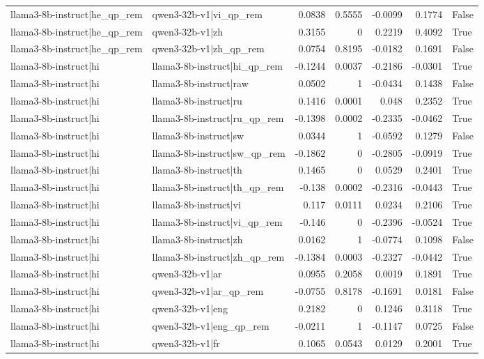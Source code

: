 \begin{table}
\begin{tabular}{l l r r r r l}
llama3-8b-instruct|he_qp_rem & qwen3-32b-v1|vi_qp_rem & 0.0838 & 0.5555 & -0.0099 & 0.1774 & False \\
llama3-8b-instruct|he_qp_rem & qwen3-32b-v1|zh & 0.3155 & 0 & 0.2219 & 0.4092 & True \\
llama3-8b-instruct|he_qp_rem & qwen3-32b-v1|zh_qp_rem & 0.0754 & 0.8195 & -0.0182 & 0.1691 & False \\
llama3-8b-instruct|hi & llama3-8b-instruct|hi_qp_rem & -0.1244 & 0.0037 & -0.2186 & -0.0301 & True \\
llama3-8b-instruct|hi & llama3-8b-instruct|raw & 0.0502 & 1 & -0.0434 & 0.1438 & False \\
llama3-8b-instruct|hi & llama3-8b-instruct|ru & 0.1416 & 0.0001 & 0.048 & 0.2352 & True \\
llama3-8b-instruct|hi & llama3-8b-instruct|ru_qp_rem & -0.1398 & 0.0002 & -0.2335 & -0.0462 & True \\
llama3-8b-instruct|hi & llama3-8b-instruct|sw & 0.0344 & 1 & -0.0592 & 0.1279 & False \\
llama3-8b-instruct|hi & llama3-8b-instruct|sw_qp_rem & -0.1862 & 0 & -0.2805 & -0.0919 & True \\
llama3-8b-instruct|hi & llama3-8b-instruct|th & 0.1465 & 0 & 0.0529 & 0.2401 & True \\
llama3-8b-instruct|hi & llama3-8b-instruct|th_qp_rem & -0.138 & 0.0002 & -0.2316 & -0.0443 & True \\
llama3-8b-instruct|hi & llama3-8b-instruct|vi & 0.117 & 0.0111 & 0.0234 & 0.2106 & True \\
llama3-8b-instruct|hi & llama3-8b-instruct|vi_qp_rem & -0.146 & 0 & -0.2396 & -0.0524 & True \\
llama3-8b-instruct|hi & llama3-8b-instruct|zh & 0.0162 & 1 & -0.0774 & 0.1098 & False \\
llama3-8b-instruct|hi & llama3-8b-instruct|zh_qp_rem & -0.1384 & 0.0003 & -0.2327 & -0.0442 & True \\
llama3-8b-instruct|hi & qwen3-32b-v1|ar & 0.0955 & 0.2058 & 0.0019 & 0.1891 & True \\
llama3-8b-instruct|hi & qwen3-32b-v1|ar_qp_rem & -0.0755 & 0.8178 & -0.1691 & 0.0181 & False \\
llama3-8b-instruct|hi & qwen3-32b-v1|eng & 0.2182 & 0 & 0.1246 & 0.3118 & True \\
llama3-8b-instruct|hi & qwen3-32b-v1|eng_qp_rem & -0.0211 & 1 & -0.1147 & 0.0725 & False \\
llama3-8b-instruct|hi & qwen3-32b-v1|fr & 0.1065 & 0.0543 & 0.0129 & 0.2001 & True \\

\end{tabular}
\end{table}
